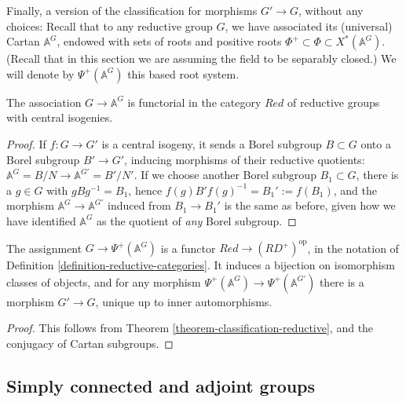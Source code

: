 Finally, a version of the classification for morphisms $G'\to G$, without any choices: Recall that to any reductive group $G$, we have associated its (universal) Cartan $\mathbb A^G$, endowed with sets of roots and positive roots $\Phi^+\subset \Phi\subset X^*(\mathbb A^G)$. (Recall that in this section we are assuming the field to be separably closed.) We will denote by $\Psi^+(\mathbb A^G)$ this based root system.

\begin{lemma}
 \label{lemma-Cartan-functorial}
The association $G\to \mathbb A^G$ is functorial in the category $Red$ of reductive groups with central isogenies.
\end{lemma}

\begin{proof}
 If $f:G\to G'$ is a central isogeny, it sends a Borel subgroup $B\subset G$ onto a Borel subgroup $B'\to G'$, inducing morphisms of their reductive quotients: $\mathbb A^G=B/N\to \mathbb A^{G'}=B'/N'$. If we choose another Borel subgroup $B_1\subset G$, there is a $g\in G$ with $g B g^{-1} = B_1$, hence $f(g) B' f(g)^{-1} = B_1':=f(B_1)$, and the morphism $\mathbb A^G\to \mathbb A^{G'}$ induced from $B_1\to B_1'$ is the same as before, given how we have identified $\mathbb A^G$ as the quotient of \emph{any} Borel subgroup.
\end{proof}


\begin{theorem}
\label{theorem-classification-with-universal-Cartan}
The assignment $G \to \Psi^+(\mathbb A^G)$ is a functor $Red\to (RD^+)^{\text{op}}$, in the notation of Definition \ref{definition-reductive-categories}. It induces a bijection on isomorphism classes of objects, and for any morphism $\Psi^+(\mathbb A^{G}) \to \Psi^+(\mathbb A^{G'})$ there is a morphism $G'\to G$, unique up to inner automorphisms.
\end{theorem}

\begin{proof}
 This follows from Theorem \ref{theorem-classification-reductive}, and the conjugacy of Cartan subgroups.
\end{proof}





\subsection{Simply connected and adjoint groups}
\label{subsection-simply-connected-adjoint}

